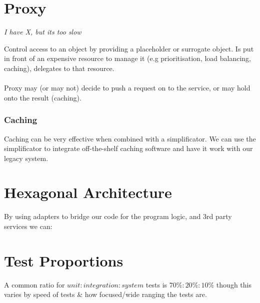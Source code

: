 \documentclass{report}
\begin{document}
    \section*{Proxy}
        \centerline{\textit{I have X, but its too slow}}
        Control access to an object by providing a placeholder or surrogate object. Is put in front of an expensive resource to manage it (e.g prioritisation, load balancing, caching), delegates to that resource.
        \\
        \\ Proxy may (or may not) decide to push a request on to the service, or may hold onto the result (caching).
        \subsubsection*{Caching}
            Caching can be very effective when combined with a simplificator. We can use the simplificator to integrate off-the-shelf caching software and have it work with our legacy system.
        
    \section*{Hexagonal Architecture}
        By using adapters to bridge our code for the program logic, and 3rd party services we can:
        \begin{itemize}
        \end{itemize}
    
    \section*{Test Proportions}
        A common ratio for $unit : integration : system$ tests is $70\% : 20\% : 10\%$ though this varies by speed of tests \& how focused/wide ranging the tests are.
        
\end{document}
